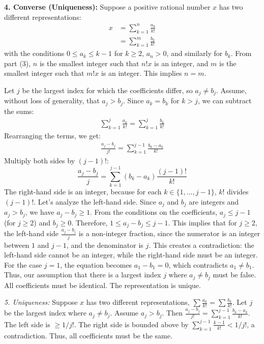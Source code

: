 \textbf{4. Converse (Uniqueness):}
Suppose a positive rational number $x$ has two different representations:
\begin{align*}
x &= \sum_{k=1}^n \frac{a_k}{k!}\\
&= \sum_{k=1}^m \frac{b_k}{k!}
\end{align*}
with the conditions $0 \le a_k \le k-1$ for $k \ge 2$, $a_n > 0$, and similarly for $b_k$.
From part (3), $n$ is the smallest integer such that $n!x$ is an integer, and $m$ is the smallest integer such that $m!x$ is an integer. This implies $n=m$.

Let $j$ be the largest index for which the coefficients differ, so $a_j \neq b_j$. Assume, without loss of generality, that $a_j > b_j$.
Since $a_k = b_k$ for $k > j$, we can subtract the sums:
\begin{align*}
\sum_{k=1}^j \frac{a_k}{k!} = \sum_{k=1}^j \frac{b_k}{k!}
\end{align*}
Rearranging the terms, we get:
\begin{align*}
\frac{a_j - b_j}{j!} = \sum_{k=1}^{j-1} \frac{b_k - a_k}{k!}
\end{align*}
Multiply both sides by $(j-1)!$:
\[ \frac{a_j - b_j}{j} = \sum_{k=1}^{j-1} (b_k - a_k) \frac{(j-1)!}{k!} \]
The right-hand side is an integer, because for each $k \in \{1, \dots, j-1\}$, $k!$ divides $(j-1)!$.
Let's analyze the left-hand side. Since $a_j$ and $b_j$ are integers and $a_j > b_j$, we have $a_j - b_j \geq 1$.
From the conditions on the coefficients, $a_j \leq j-1$ (for $j \ge 2$) and $b_j \geq 0$.
Therefore, $1 \leq a_j - b_j \leq j-1$.
This implies that for $j \ge 2$, the left-hand side $\frac{a_j - b_j}{j}$ is a non-integer fraction, since the numerator is an integer between $1$ and $j-1$, and the denominator is $j$.
This creates a contradiction: the left-hand side cannot be an integer, while the right-hand side must be an integer.
For the case $j=1$, the equation becomes $a_1 - b_1 = 0$, which contradicts $a_1 \neq b_1$.
Thus, our assumption that there is a largest index $j$ where $a_j \neq b_j$ must be false. All coefficients must be identical. The representation is unique.

\textit{5. Uniqueness:} Suppose $x$ has two different representations, $\sum \frac{a_k}{k!} = \sum \frac{b_k}{k!}$. Let $j$ be the largest index where $a_j \neq b_j$. Assume $a_j > b_j$. Then $\frac{a_j - b_j}{j!} = \sum_{k=1}^{j-1} \frac{b_k - a_k}{k!}$. The left side is $\ge 1/j!$. The right side is bounded above by $\sum_{k=1}^{j-1} \frac{k-1}{k!} < 1/j!$, a contradiction. Thus, all coefficients must be the same.



